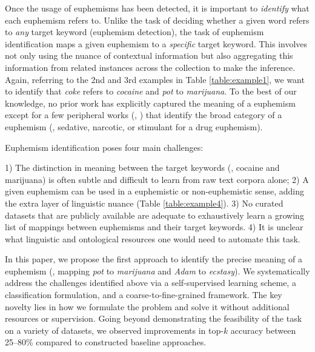 Once the usage of euphemisms has been detected, it is important to \emph{identify} what each euphemism refers to. Unlike the  task of deciding whether a given word refers to \textit{any} target keyword (euphemism detection), the task of euphemism identification maps a given euphemism to a \textit{specific} target keyword. This involves not only using the nuance of contextual information but also aggregating this information from related instances across the collection to make the inference.     
Again, referring to the 2nd and 3rd examples in Table \ref{table:example1}, we want to identify that {\em coke} refers to {\em cocaine} and {\em pot}  to {\em marijuana}. 
To the best of our knowledge, no prior work has explicitly captured the meaning of a euphemism except for a few peripheral works (\eg, \cite{yuan2018reading}) that identify the broad category of a euphemism (\eg, sedative, narcotic, or stimulant for a drug euphemism). 

Euphemism identification poses four main challenges: 

1) The distinction in meaning between the target keywords  (\eg, cocaine and marijuana) is often subtle and difficult  to learn from  raw text corpora alone; 
2) A given euphemism can  be used in a euphemistic or  non-euphemistic sense, adding  the extra layer of linguistic nuance (Table \ref{table:example4}). 
3) No curated datasets that are publicly available are adequate to exhaustively learn a growing list of mappings between euphemisms and their target keywords.
4) It is unclear what linguistic and ontological resources one would need to automate this task. 

In this paper, we propose the first approach to identify the precise meaning of a euphemism (\eg, mapping {\em pot}  to {\em marijuana} and {\em Adam} to {\em ecstasy}). 
We systematically address  the  challenges identified above via a self-supervised learning scheme, a classification formulation, and a coarse-to-fine-grained framework. 
The key novelty lies in how we formulate the problem and solve it without additional resources or supervision. 
Going beyond demonstrating the feasibility of the task on a variety of datasets, we observed improvements in top-$k$ accuracy between 25--80\%  compared to constructed baseline approaches. 



